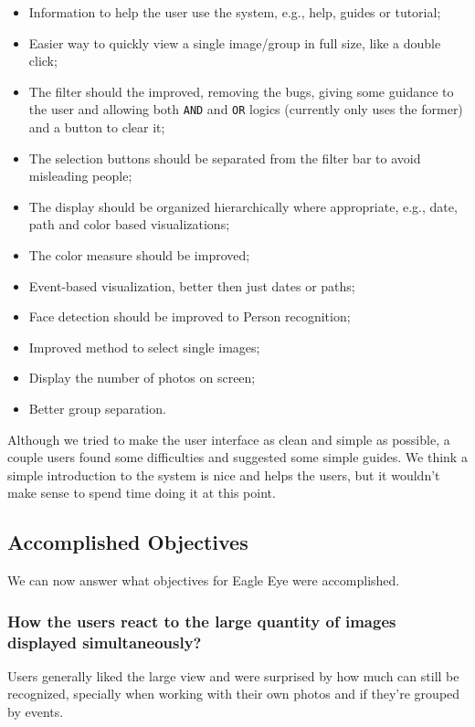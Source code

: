 \begin{itemize}
	\item Information to help the user use the system, e.g., help, guides or tutorial;
	\item Easier way to quickly view a single image/group in full size, like a double click;
	\item The filter should the improved, removing the bugs, giving some guidance to the user and allowing both \texttt{AND} and \texttt{OR} logics (currently only uses the former) and a button to clear it;
	\item The selection buttons should be separated from the filter bar to avoid misleading people;
	\item The display should be organized hierarchically where appropriate, e.g., date, path and color based visualizations;
	\item The color measure should be improved;
	\item Event-based visualization, better then just dates or paths;
	\item Face detection should be improved to Person recognition;
	\item Improved method to select single images;
	\item Display the number of photos on screen;
	\item Better group separation.
\end{itemize}

Although we tried to make the user interface as clean and simple as possible, a couple users found some difficulties and suggested some simple guides. We think a simple introduction to the system is nice and helps the users, but it wouldn't make sense to spend time doing it at this point.


\subsection{Accomplished Objectives} 

We can now answer what objectives for Eagle Eye were accomplished. 

\subsubsection{How the users react to the large quantity of images displayed simultaneously?}
Users generally liked the large view and were surprised by how much can still be recognized, specially when working with their own photos and if they're grouped by events. 

